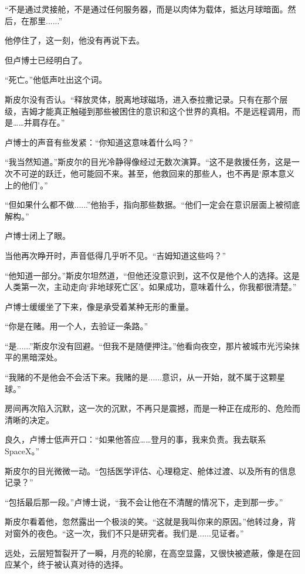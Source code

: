 “不是通过灵接舱，不是通过任何服务器，而是以肉体为载体，抵达月球暗面。然后，在那里......”

他停住了，这一刻，他没有再说下去。

但卢博士已经明白了。

“死亡。”他低声吐出这个词。

斯皮尔没有否认。“释放灵体，脱离地球磁场，进入泰拉撒记录。只有在那个层级，吉姆才能真正触碰到那些被困住的意识和这个世界的真相。不是远程调用，而是……并肩存在。”

卢博士的声音有些发紧：“你知道这意味着什么吗？”

“我当然知道。”斯皮尔的目光冷静得像经过无数次演算。“这不是救援任务，这是一次不可逆的跃迁，他可能回不来。甚至，他救回来的那些人，也不再是‘原本意义上的他们’。”

“但如果什么都不做......”他抬手，指向那些数据。“他们一定会在意识层面上被彻底解构。”

卢博士闭上了眼。

当他再次睁开时，声音低得几乎听不见。“吉姆知道这些吗？”

“他知道一部分。”斯皮尔坦然道，“但他还没意识到，这不仅是他个人的选择。这是人类第一次，主动走向‘非地球死亡区’。如果成功，意味着什么，你我都很清楚。”

卢博士缓缓坐了下来，像是承受着某种无形的重量。

“你是在赌。用一个人，去验证一条路。”

“是......”斯皮尔没有回避。“但我不是随便押注。”他看向夜空，那片被城市光污染抹平的黑暗深处。

“我赌的不是他会不会活下来。我赌的是......意识，从一开始，就不属于这颗星球。”

房间再次陷入沉默，这一次的沉默，不再只是震撼，而是一种正在成形的、危险而清晰的决定。

良久，卢博士低声开口：“如果他答应……登月的事，我来负责。我去联系SpaceX。”

斯皮尔的目光微微一动。“包括医学评估、心理稳定、舱体过渡、以及所有的信息记录？”

“包括最后那一段。”卢博士说，“我不会让他在不清醒的情况下，走到那一步。”

斯皮尔看着他，忽然露出一个极淡的笑。“这就是我叫你来的原因。”他转过身，背对窗外的夜色。“这一次，我们不只是研究者。我们是......见证者。”

远处，云层短暂裂开了一瞬，月亮的轮廓，在高空显露，又很快被遮蔽，像是在回应某个，终于被认真对待的选择。
